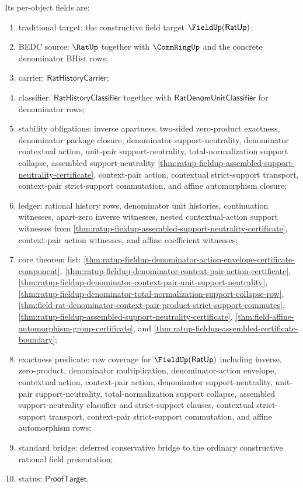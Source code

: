 \begin{definition}
Its per-object fields are:
\begin{enumerate}
  \item traditional target: the constructive field target
  $\FieldUp(\mathsf{RatUp})$;
  \item BEDC source: $\RatUp$ together with $\CommRingUp$ and the concrete
  denominator BHist rows;
  \item carrier: $\mathsf{RatHistoryCarrier}$;
  \item classifier: $\mathsf{RatHistoryClassifier}$ together with
  $\mathsf{RatDenomUnitClassifier}$ for denominator rows;
  \item stability obligations: inverse apartness, two-sided zero-product
  exactness, denominator package closure, denominator support-neutrality,
  denominator contextual action, unit-pair support-neutrality,
  total-normalization support collapse, assembled support-neutrality
  \autoref{thm:ratup-fieldup-assembled-support-neutrality-certificate},
  context-pair action, contextual strict-support transport, context-pair
  strict-support commutation, and affine automorphism closure;
  \item ledger: rational history rows, denominator unit histories,
  continuation witnesses, apart-zero inverse witnesses, nested contextual-action
  support witnesses from
  \autoref{thm:ratup-fieldup-assembled-support-neutrality-certificate},
  context-pair action witnesses, and affine coefficient witnesses;
  \item core theorem list:
  \autoref{thm:ratup-fieldup-denominator-action-envelope-certificate-component},
  \autoref{thm:ratup-fieldup-denominator-context-pair-action-certificate},
  \autoref{thm:ratup-fieldup-denominator-context-pair-unit-support-neutrality},
  \autoref{thm:ratup-fieldup-denominator-total-normalization-support-collapse-row},
  \autoref{thm:field-rat-denominator-context-pair-product-strict-support-commutes},
  \autoref{thm:ratup-fieldup-assembled-support-neutrality-certificate},
  \autoref{thm:field-affine-automorphism-group-certificate}, and
  \autoref{thm:ratup-fieldup-assembled-certificate-boundary};
  \item exactness predicate: row coverage for $\FieldUp(\mathsf{RatUp})$
  including inverse, zero-product, denominator multiplication,
  denominator-action envelope, contextual action, context-pair action,
  denominator support-neutrality, unit-pair support-neutrality,
  total-normalization support collapse, assembled support-neutrality classifier
  and strict-support clauses, contextual strict-support transport,
  context-pair strict-support commutation, and affine automorphism rows;
  \item standard bridge: deferred conservative bridge to the ordinary
  constructive rational field presentation;
  \item status: $\mathsf{ProofTarget}$.
\end{enumerate}
\end{definition}


